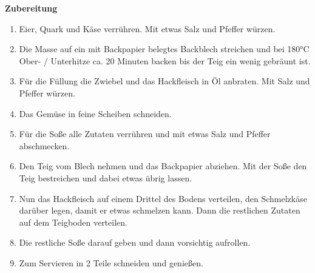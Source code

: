 \documentclass[a5paper,10pt]{article}
\begin{document}
\newpage
\noindent\textbf{\large Zubereitung}
\begin{enumerate}
    \item Eier, Quark und Käse verrühren. Mit etwas Salz und Pfeffer würzen.
    \item Die Masse auf ein mit Backpapier belegtes Backblech streichen und bei 180°C Ober- / Unterhitze ca. 20 Minuten backen bis der Teig ein wenig gebräunt ist.
    \item Für die Füllung die Zwiebel und das Hackfleisch in Öl anbraten. Mit Salz und Pfeffer würzen.
    \item Das Gemüse in feine Scheiben schneiden.
    \item Für die Soße alle Zutaten verrühren und mit etwas Salz und Pfeffer abschmecken.
    \item Den Teig vom Blech nehmen und das Backpapier abziehen. Mit der Soße den Teig bestreichen und dabei etwas übrig lassen.
    \item Nun das Hackfleisch auf einem Drittel des Bodens verteilen, den Schmelzkäse darüber legen, damit er etwas schmelzen kann. Dann die restlichen Zutaten auf dem Teigboden verteilen.
    \item Die restliche Soße darauf geben und dann vorsichtig aufrollen.
    \item Zum Servieren in 2 Teile schneiden und genießen.
\end{enumerate}
\end{document}
